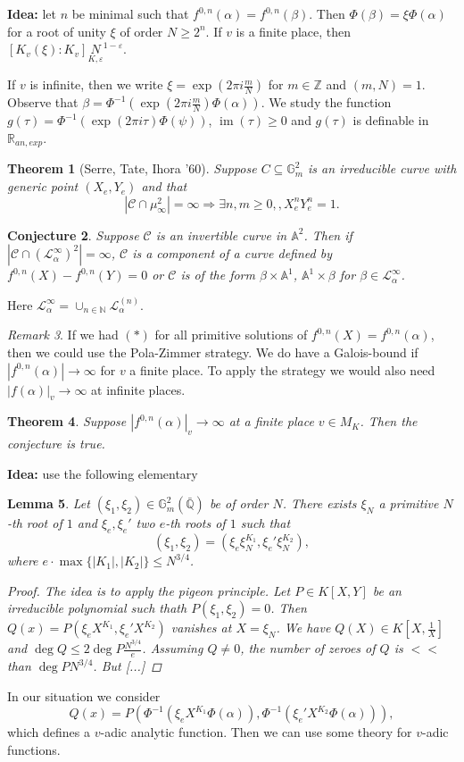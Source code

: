 \documentclass[11pt,A4]{article}
\theoremstyle{plain}
\newtheorem{thm}{Theorem}[section]
\newtheorem{lm}[thm]{Lemma}
\newtheorem{conj}[thm]{Conjecture}
\theoremstyle{definition}
\theoremstyle{remark}
\newtheorem{rem}[thm]{Remark}
\newcommand{\N}{\mathbb{N}}
\newcommand{\Z}{\mathbb{Z}}
\newcommand{\Q}{\mathbb{Q}}
\newcommand{\R}{\mathbb{R}}
\newcommand{\1}{\mathbbm{1}}
\newcommand{\Gm}{\mathbb{G}_{m}}
\newcommand{\bbA}{\mathbb{A}}
\newcommand{\calC}{\mathcal{C}}
\renewcommand{\L}{\mathcal{L}}
\DeclareMathOperator{\im}{im}
\newcommand{\sub}{\subseteq}
\begin{document}
\textbf{Idea:} let $n$ be minimal such that $f^{0,n}(\alpha)=f^{0,n}(\beta)$.
Then $\Phi(\beta)=\xi \Phi(\alpha)$ for a root of unity $\xi$ of order $N\geqslant 2^{n}$.
If $v$ is a finite place, then $[K_{v}(\xi):K_{v}]\underset{K,\varepsilon} N^{1-\varepsilon}$.

If $v$ is infinite, then we write $\xi=\exp(2\pi i\frac{m}{N})$ for $m\in \Z$ and $(m,N)=1$.
Observe that $\beta=\Phi^{-1}(\exp(2\pi i\frac{m}{N})\Phi(\alpha))$.
We study the function $g(\tau)=\Phi^{-1}(\exp(2\pi i\tau)\Phi(\psi))$, $\im(\tau)\geqslant 0$ and $g(\tau)$ is definable in $\R_{an,exp}$.

\begin{thm}[Serre, Tate, Ihora '60]
    Suppose $C\sub\Gm^{2}$ is an irreducible curve with generic point $(X_{e},Y_{e})$ and that
    \[ |\calC\cap \mu_{\infty}^{2} |=\infty \Rightarrow \exists n,m\geqslant 0,,X_{e}^{n}Y_{e}^{n}=1.\]
\end{thm}

\begin{conj}
    Suppose $\calC$ is an invertible curve in $\bbA^{2}$.
    Then if $|\calC\cap (\L_{\alpha}^{\infty})^{2}|=\infty$, $\calC$ is a component of a curve defined by $f^{0,n}(X)-f^{0,n}(Y)=0$ or $\calC$ is of the form $\beta\times \bbA^{1}$, $\bbA^{1}\times \beta$ for $\beta\in\L_{\alpha}^{\infty}$.
\end{conj}

Here $\L_{\alpha}^{\infty}=\cup_{n\in\N}\L_{\alpha}^{(n)}$.

\begin{rem}
    If we had $(*)$ for all primitive solutions of $f^{0,n}(X)=f^{0,n}(\alpha)$, then we could use the Pola-Zimmer strategy.
    We do have a Galois-bound if $|f^{0,n}(\alpha)|\to \infty$ for $v$ a finite place.
    To apply the strategy we would also need $|f(\alpha)|_{v}\to \infty$ at infinite places.
\end{rem}

\begin{thm}
    Suppose $|f^{0,n}(\alpha)|_{v}\to \infty$ at a finite place $v\in M_{K}$.
    Then the conjecture is true.
\end{thm}

\textbf{Idea:} use the following elementary
\begin{lm}
    Let $(\xi_{1},\xi_{2})\in \Gm^{2}(\bar{\Q})$ be of order $N$.
    There exists $\xi_{N}$ a primitive $N$-th root of $1$ and $\xi_{e},\xi_{e}'$ two $e$-th roots of $1$ such that
    \[ (\xi_{1},\xi_{2})=(\xi_{e}\xi_{N}^{K_{1}},\xi_{e}'\xi_{N}^{K_{2}}), \]
    where $e\cdot \max\{|K_{1}|,|K_{2}|\}\leqslant N^{3/4}$.
    \begin{proof}
	The idea is to apply the pigeon principle.
	Let $P\in K[X,Y]$ be an irreducible polynomial such thath $P(\xi_{1},\xi_{2})=0$.
	Then $Q(x)=P(\xi_{e}X^{K_{1}},\xi_{e}'X^{K_{2}})$ vanishes at $X=\xi_{N}$.
	We have $Q(X)\in K[X,\frac{1}{X}]$ and $\deg{Q}\leqslant 2\deg{P}\frac{N^{3/4}}{e}$.
	Assuming $Q\neq 0$, the number of zeroes of $Q$ is $<<$ than $\deg{P}N^{3/4}$.
	But [...]
    \end{proof}
\end{lm}

In our situation we consider
\[ Q(x)=P(\Phi^{-1}(\xi_{e}X^{K_{1}}\Phi(\alpha)),\Phi^{-1}(\xi_{e}'X^{K_{2}}\Phi(\alpha))),\]
which defines a $v$-adic analytic function.
Then we can use some theory for $v$-adic functions.



\end{document}
